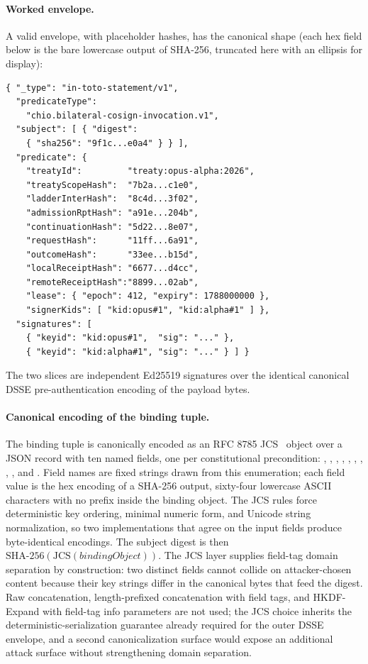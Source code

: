 \paragraph{Worked envelope.} A valid envelope, with placeholder hashes, has the canonical shape (each hex field below is the bare lowercase output of SHA-256, truncated here with an ellipsis for display):
\begin{small}
\begin{verbatim}
{ "_type": "in-toto-statement/v1",
  "predicateType":
    "chio.bilateral-cosign-invocation.v1",
  "subject": [ { "digest":
    { "sha256": "9f1c...e0a4" } } ],
  "predicate": {
    "treatyId":         "treaty:opus-alpha:2026",
    "treatyScopeHash":  "7b2a...c1e0",
    "ladderInterHash":  "8c4d...3f02",
    "admissionRptHash": "a91e...204b",
    "continuationHash": "5d22...8e07",
    "requestHash":      "11ff...6a91",
    "outcomeHash":      "33ee...b15d",
    "localReceiptHash": "6677...d4cc",
    "remoteReceiptHash":"8899...02ab",
    "lease": { "epoch": 412, "expiry": 1788000000 },
    "signerKids": [ "kid:opus#1", "kid:alpha#1" ] },
  "signatures": [
    { "keyid": "kid:opus#1",  "sig": "..." },
    { "keyid": "kid:alpha#1", "sig": "..." } ] }
\end{verbatim}
\end{small}
The two  slices are independent Ed25519 signatures over the identical canonical DSSE pre-authentication encoding of the payload bytes.

\paragraph{Canonical encoding of the binding tuple.} The binding tuple is canonically encoded as an RFC 8785 JCS~\cite{rfc8785} object over a JSON record with ten named fields, one per constitutional precondition: , , , , , , , , , and . Field names are fixed strings drawn from this enumeration; each field value is the hex encoding of a SHA-256 output, sixty-four lowercase ASCII characters with no  prefix inside the binding object. The JCS rules force deterministic key ordering, minimal numeric form, and Unicode string normalization, so two implementations that agree on the input fields produce byte-identical encodings. The subject digest is then $\mathrm{SHA\text{-}256}(\mathrm{JCS}(\mathit{bindingObject}))$. The JCS layer supplies field-tag domain separation by construction: two distinct fields cannot collide on attacker-chosen content because their key strings differ in the canonical bytes that feed the digest. Raw concatenation, length-prefixed concatenation with field tags, and HKDF-Expand with field-tag info parameters are not used; the JCS choice inherits the deterministic-serialization guarantee already required for the outer DSSE envelope, and a second canonicalization surface would expose an additional attack surface without strengthening domain separation.


